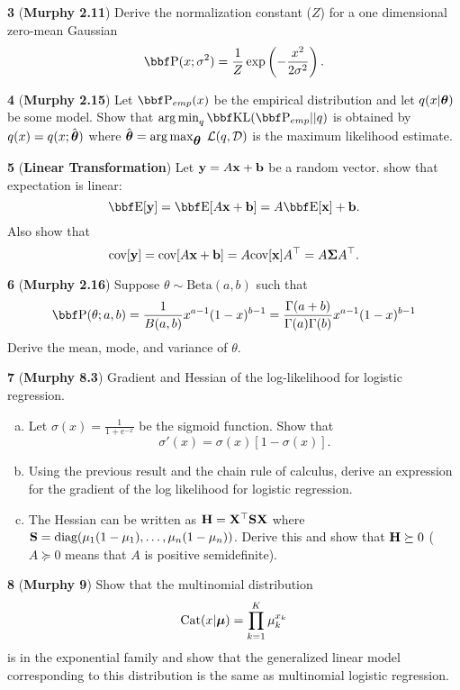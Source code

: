 \documentclass[12pt,letterpaper,fleqn]{hmcpset}
\begin{document}
\textbf{3} (\textbf{Murphy 2.11}) Derive the normalization constant ($Z$) for a one dimensional
zero-mean Gaussian
\[
    \PP(x; \sigma^2) = \frac{1}{Z}\exp\left(-\frac{x^2}{2\sigma^2}\right).
\]

\textbf{4} (\textbf{Murphy 2.15}) Let $\PP_{emp}(x)$ be the empirical distribution and let
$q(x|\hbox{\boldmath$\theta$})$ be some model. Show that $\argmin_q \KL(\PP_{emp} || q)$ is obtained by
$q(x) = q(x ; \hat{\hbox{\boldmath$\theta$}})$ where $\hat{\hbox{\boldmath$\theta$}} = \operatorname*{arg\,max}_{\hbox{\boldmath$\theta$}} \;{\cal L}(q, {\cal D})$ is
the maximum likelihood estimate.

\textbf{5} (\textbf{Linear Transformation}) Let ${\bf y} = A{\bf x} + {\bf b}$ be a random vector.
show that expectation is linear:
\[
    \EE[\yy] = \EE[A\xx + \bb] = A\EE[\xx] + \bb.
\]
Also show that
\[
    {\hbox{cov}}[{\bf y}] = {\hbox{cov}}[A{\bf x} + {\bf b}] = A {\hbox{cov}}[{\bf x}] A^\top = A\hbox{\boldmath$\Sigma$} A^\top.
\]

\textbf{6} (\textbf{Murphy 2.16}) Suppose $\theta \sim \text{Beta}(a,b)$ such
that
\[
    \PP(\theta; a,b) = \frac{1}{B(a,b)} x^{a-1}(1-x)^{b-1} = \frac{\Gamma(a+b)}{\Gamma(a)\Gamma(b)} x^{a-1}(1-x)^{b-1}
\]
Derive the mean, mode, and variance of $\theta$.

\textbf{7} (\textbf{Murphy 8.3}) Gradient and Hessian of the log-likelihood for
logistic regression.
\begin{enumerate}[(a)]
    \item Let $\sigma(x) = \frac{1}{1 + e^{-x}}$ be the sigmoid function. Show that
        \[
            \sigma'(x) = \sigma(x)\left[1 - \sigma(x)\right].
        \]
    \item Using the previous result and the chain rule of calculus, derive an
        expression for the gradient of the log likelihood for logistic regression.
    \item The Hessian can be written as ${\bf H}={\bf X}^\top{\bf S}{\bf X}$ where ${\bf S} =
        {\hbox{diag}}(\mu_1(1-\mu_1), \dots, \mu_n(1-\mu_n))$. Derive this and show that
        ${\bf H} \succeq 0$ ($A \succeq 0$ means that $A$ is positive semidefinite).
\end{enumerate}

\textbf{8} (\textbf{Murphy 9}) Show that the multinomial distribution
\[
    \text{Cat}(x|\hbox{\boldmath$\mu$}) = \prod_{k=1}^K \mu_k^{x_k}
\]
is in the exponential family and show that the generalized linear model
corresponding to this distribution is the same as multinomial logistic
regression.
\end{document}

